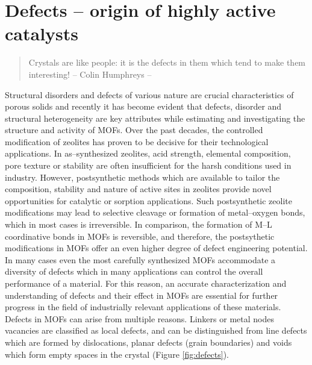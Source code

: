 \section{Defects -- origin of highly active catalysts}
\label{sec:defects} 
 \begin{quotation}
Crystals are like people: it is the defects in them
which tend to make them interesting! -- Colin Humphreys --
 \end{quotation}
\npar
Structural disorders and defects of various nature are crucial characteristics
of porous solids and recently it has become evident that defects, disorder and structural heterogeneity are key
attributes while estimating and investigating the structure and activity of
MOFs. Over the past decades, the controlled modification of zeolites has proven
to be decisive for their technological applications. 
In as--synthesized zeolites,
acid strength, elemental composition, pore texture or stability are often
insufficient for the harsh conditions used in industry. However, postsynthetic
methods which are available to tailor the composition, stability and nature of
active sites in zeolites provide novel opportunities for catalytic or sorption
applications. Such postsynthetic zeolite modifications may lead to selective
cleavage or formation of metal--oxygen bonds, which in most cases is
irreversible. In comparison, the formation of M--L coordinative
bonds in MOFs is reversible, and therefore, the postsythetic modifications in MOFs offer an even higher degree of defect engineering potential.
In many cases even the most carefully synthesized MOFs accommodate a diversity
of defects which in many applications can control the overall performance of a material.
For this reason, an accurate characterization and understanding of defects and their effect in
MOFs are essential for further progress in the field of industrially relevant
applications of these materials. Defects in MOFs can arise from multiple
reasons.
Linkers or metal nodes vacancies are classified as local defects, and
can be distinguished from line defects which are formed by
dislocations, planar defects (grain boundaries) and voids which form
empty spaces in the crystal (Figure \ref{fig:defects}). 

